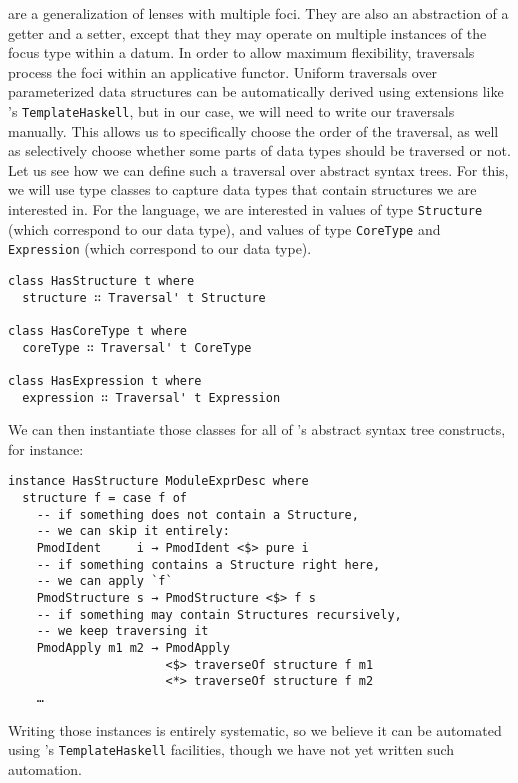  are a generalization of lenses with multiple foci.  They are
also an abstraction of a getter and a setter, except that they may operate on
multiple instances of the focus type within a datum.  In order to allow maximum
flexibility, traversals process the foci within an applicative functor.  Uniform
traversals over parameterized data structures can be automatically derived using
extensions like \Haskell{}'s \texttt{TemplateHaskell}, but in our
case, we will need to write our traversals manually.  This allows us to
specifically choose the order of the traversal, as well as selectively choose
whether some parts of data types should be traversed or not.  Let us see how we
can define such a traversal over \OCaml{} abstract syntax trees.  For this, we
will use type classes to capture data types that contain structures we are
interested in.  For the \OCaml{} language, we are interested in values of type
\texttt{Structure} (which correspond to our 
data type), and values of type \texttt{CoreType} and
\texttt{Expression} (which correspond to our  data
type).

\begin{verbatim}
class HasStructure t where
  structure ∷ Traversal' t Structure

class HasCoreType t where
  coreType ∷ Traversal' t CoreType

class HasExpression t where
  expression ∷ Traversal' t Expression
\end{verbatim}

We can then instantiate those classes for all of \OCaml{}'s abstract syntax tree
constructs, for instance:

\begin{verbatim}
instance HasStructure ModuleExprDesc where
  structure f = case f of
    -- if something does not contain a Structure,
    -- we can skip it entirely:
    PmodIdent     i → PmodIdent <$> pure i
    -- if something contains a Structure right here,
    -- we can apply `f`
    PmodStructure s → PmodStructure <$> f s
    -- if something may contain Structures recursively,
    -- we keep traversing it
    PmodApply m1 m2 → PmodApply
                      <$> traverseOf structure f m1
                      <*> traverseOf structure f m2
    …
\end{verbatim}

\noindent Writing those instances is entirely systematic, so we believe it can
be automated using \Haskell{}'s \texttt{TemplateHaskell}
facilities, though we have not yet written such automation.

